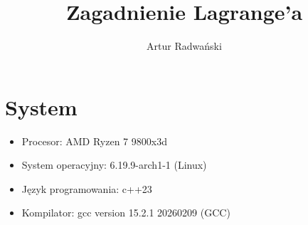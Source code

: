 \documentclass{article}
\author{Artur Radwański}
\title{Zagadnienie Lagrange'a}
\begin{document}
\maketitle
% 
% 


\linespread{1.3}
\selectfont

\section{System}
\begin{itemize}
    \item Procesor: AMD Ryzen 7 9800x3d
    \item System operacyjny: 6.19.9-arch1-1 (Linux)
    \item Język programowania: c++23
    \item Kompilator: gcc version 15.2.1 20260209 (GCC) 
\end{itemize}
\end{document}
